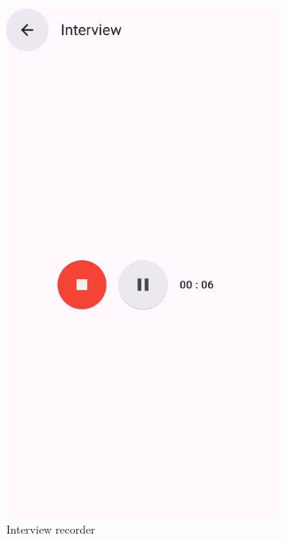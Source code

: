 \begin{figure}[!htb]
\begin{subfigure}{.25\textwidth}
        \includegraphics[width=.8666\linewidth]{images/app_interview_recorder.jpg}
        \caption{Interview recorder}
        \label{subfig:app_interview_recorder}
    \end{subfigure}%
    \begin{subfigure}{.25\textwidth}
        \centering

\end{subfigure}
\end{figure}
